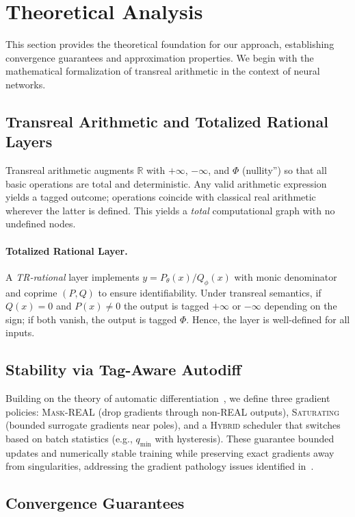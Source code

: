 \documentclass[twoside,11pt]{article}
\newcommand{\RR}{\mathbb{R}}
\newcommand{\trReal}{\textsc{REAL}}
\newcommand{\maskreal}{\textsc{Mask-REAL}}
\newcommand{\saturating}{\textsc{Saturating}}
\newcommand{\hybrid}{\textsc{Hybrid}}
\newcommand{\qmin}{q_{\min}}
\begin{document}
\section{Theoretical Analysis}
\label{sec:theory}
This section provides the theoretical foundation for our approach, establishing convergence guarantees and approximation properties. We begin with the mathematical formalization of transreal arithmetic in the context of neural networks.

\subsection{Transreal Arithmetic and Totalized Rational Layers}
Transreal arithmetic augments $\RR$ with $+\infty$, $-\infty$, and $\Phi$ (nullity'') so that all basic operations are total and deterministic. Any valid arithmetic expression yields a tagged outcome; operations coincide with classical real arithmetic wherever the latter is defined. This yields a \emph{total} computational graph with no undefined nodes.

\paragraph{Totalized Rational Layer.} A \emph{TR-rational} layer implements $y = P_\theta(x)/Q_\phi(x)$ with monic denominator and coprime $(P,Q)$ to ensure identifiability. Under transreal semantics, if $Q(x)=0$ and $P(x)\neq 0$ the output is tagged $+\infty$ or $-\infty$ depending on the sign; if both vanish, the output is tagged $\Phi$. Hence, the layer is well-defined for all inputs.

\subsection{Stability via Tag-Aware Autodiff}
Building on the theory of automatic differentiation~\citep{griewank2008evaluating,baydin2017automatic}, we define three gradient policies: \maskreal{} (drop gradients through non-\trReal{} outputs), \saturating{} (bounded surrogate gradients near poles), and a \hybrid{} scheduler that switches based on batch statistics (e.g., $\qmin$ with hysteresis). These guarantee bounded updates and numerically stable training while preserving exact gradients away from singularities, addressing the gradient pathology issues identified in~\citet{pascanu2013difficulty,bengio1994learning}.

\subsection{Convergence Guarantees}
\end{document}

